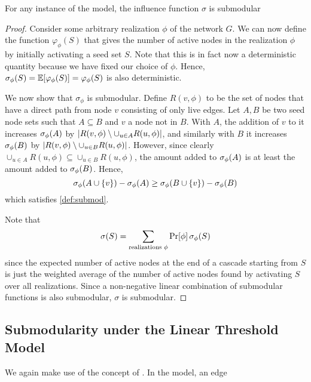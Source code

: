 \begin{theorem}
    For any instance of the \icmodel{} model, the influence function $\sigma$ is submodular
    \label{thm:ic_submod}
\end{theorem}
\begin{proof}
    Consider some arbitrary realization $\phi$ of the network $G$. We can now define the function 
    $\varphi_{\phi}(S)$ that gives the number of active nodes in the realization $\phi$ by initially activating a seed set $S$. Note that this is in fact now a deterministic quantity because we have fixed our choice of $\phi$. Hence, $\sigma_{\phi} \! \left( S \right) = \mathbb{E}\! \left[  \varphi_{\phi} \! \left( S \right)  \right] = \varphi_{\phi} \! \left( S \right)$ is also deterministic. 
    
    We now show that $\sigma_{\phi}$ is submodular. Define $R(v, \phi)$ to be the set of nodes that have a direct path from node $v$ consisting of only live edges. Let $A, B$ be two seed node sets such that $A \subseteq B$ and $v$ a node not in $B$. With $A$, the addition of $v$ to it increases $\sigma_{\phi} \! \left( A \right)$ by $\left\lvert R(v, \phi) \setminus \cup_{u\in A} R(u, \phi) \right\rvert$, 
    and similarly with $B$ it increases $\sigma_{\phi} \! \left( B \right)$ by $\left\lvert R(v, \phi) \setminus \cup_{u\in B} R(u, \phi) \right\rvert$. However, since clearly $\cup_{u\in A} R(u, \phi) \subseteq \cup_{u\in B} R(u, \phi)$, the amount added to $\sigma_{\phi} \! \left( A \right)$ is at least the amount added to $\sigma_{\phi} \! \left( B \right)$. Hence, 
    \begin{equation*}
        \sigma_{\phi} \! \left( A \cup \left\{ v \right\} \right) - \sigma_{\phi} \! \left( A \right) \geq \sigma_{\phi} \! \left( B \cup \left\{ v \right\} \right) - \sigma_{\phi} \! \left( B \right)
    \end{equation*}
    which satisfies \cref{def:submod}. 
    
    Note that 
    \begin{equation*}
        \sigma \! \left( S \right) = \sum_{\text{realizations } \phi} \mathrm{Pr}\! \left[ \phi \right] \sigma_{\phi} \! \left( S \right)
    \end{equation*}
    since the expected number of active nodes at the end of a cascade starting from $S$ is just the weighted average of the number of active nodes found by activating $S$ over all realizations. Since a non-negative linear combination of submodular functions is also submodular, $\sigma$ is submodular. 
\end{proof}

\subsection{Submodularity under the Linear Threshold Model}
We again make use of the concept of \realization[realizations]. In the \ltmodel{} model, an edge 